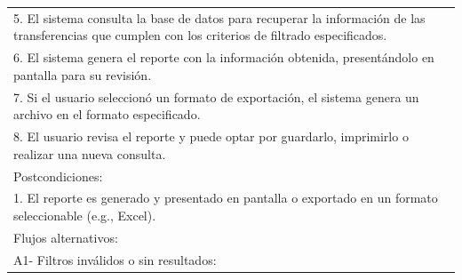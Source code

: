 \documentclass[stu, 12pt, letterpaper, donotrepeattitle, floatsintext, natbib]{apa7}
\begin{document}
\begin{longtable}{@{} p{16.5cm} @{}}
    5. El sistema consulta la base de datos para recuperar la informaci\'on de las transferencias que cumplen con los criterios de filtrado especificados.                                                                                                                              \\
    6. El sistema genera el reporte con la informaci\'on obtenida, present\'andolo en pantalla para su revisi\'on.                                                                                                                                                                      \\
    7. Si el usuario seleccion\'o un formato de exportaci\'on, el sistema genera un archivo en el formato especificado.                                                                                                                                                                 \\
    8. El usuario revisa el reporte y puede optar por guardarlo, imprimirlo o realizar una nueva consulta.                                                                                                                                                                              \\ \midrule
    Postcondiciones:                                                                                                                                                                                                                                                                    \\
    1. El reporte es generado y presentado en pantalla o exportado en un formato seleccionable (e.g., Excel).                                                                                                                                                                           \\ \midrule
    Flujos alternativos:                                                                                                                                                                                                                                                                \\
    A1- Filtros inv\'alidos o sin resultados:                                                                                                                                                                                                                                           \\

\end{longtable}
\end{document}
